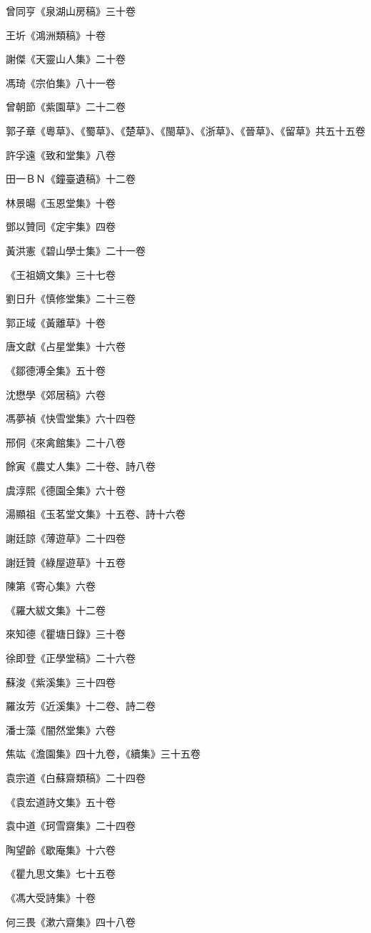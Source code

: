 曾同亨《泉湖山房稿》三十卷

王圻《鴻洲類稿》十卷

謝傑《天靈山人集》二十卷

馮琦《宗伯集》八十一卷

曾朝節《紫園草》二十二卷

郭子章《粵草》、《蜀草》、《楚草》、《閩草》、《浙草》、《晉草》、《留草》共五十五卷

許孚遠《致和堂集》八卷

田一ＢＮ《鐘臺遺稿》十二卷

林景暘《玉恩堂集》十卷

鄧以贊同《定宇集》四卷

黃洪憲《碧山學士集》二十一卷

《王祖嫡文集》三十七卷

劉日升《慎修堂集》二十三卷

郭正域《黃離草》十卷

唐文獻《占星堂集》十六卷

《鄒德溥全集》五十卷

沈懋學《郊居稿》六卷

馮夢禎《快雪堂集》六十四卷

邢侗《來禽館集》二十八卷

餘寅《農丈人集》二十卷、詩八卷

虞淳熙《德園全集》六十卷

湯顯祖《玉茗堂文集》十五卷、詩十六卷

謝廷諒《薄遊草》二十四卷

謝廷贊《綠屋遊草》十五卷

陳第《寄心集》六卷

《羅大紱文集》十二卷

來知德《瞿塘日錄》三十卷

徐即登《正學堂稿》二十六卷

蘇浚《紫溪集》三十四卷

羅汝芳《近溪集》十二卷、詩二卷

潘士藻《闇然堂集》六卷

焦竑《澹園集》四十九卷，《續集》三十五卷

袁宗道《白蘇齋類稿》二十四卷

《袁宏道詩文集》五十卷

袁中道《珂雪齋集》二十四卷

陶望齡《歇庵集》十六卷

《瞿九思文集》七十五卷

《馮大受詩集》十卷

何三畏《漱六齋集》四十八卷

